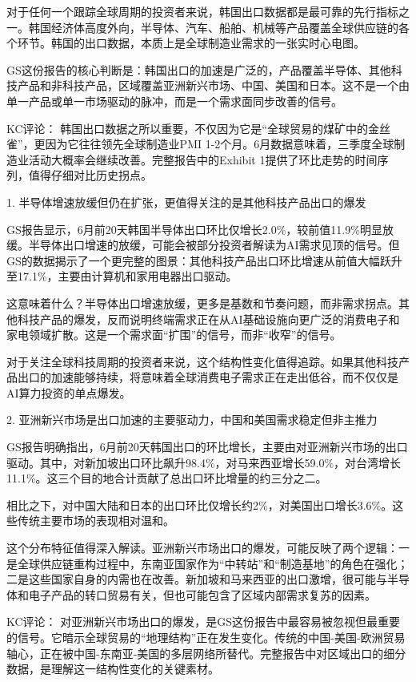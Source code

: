 \documentclass[11pt]{ctexart}
\begin{document}
对于任何一个跟踪全球周期的投资者来说，韩国出口数据都是最可靠的先行指标之一。韩国经济体高度外向，半导体、汽车、船舶、机械等产品覆盖全球供应链的各个环节。韩国的出口数据，本质上是全球制造业需求的一张实时心电图。

GS这份报告的核心判断是：韩国出口的加速是广泛的，产品覆盖半导体、其他科技产品和非科技产品，区域覆盖亚洲新兴市场、中国、美国和日本。这不是一个由单一产品或单一市场驱动的脉冲，而是一个需求面同步改善的信号。

KC评论： 韩国出口数据之所以重要，不仅因为它是“全球贸易的煤矿中的金丝雀”，更因为它往往领先全球制造业PMI 1-2个月。6月数据意味着，三季度全球制造业活动大概率会继续改善。完整报告中的Exhibit 1提供了环比走势的时间序列，值得仔细对比历史拐点。

1. 半导体增速放缓但仍在扩张，更值得关注的是其他科技产品出口的爆发

GS报告显示，6月前20天韩国半导体出口环比仅增长2.0\%，较前值11.9\%明显放缓。半导体出口增速的放缓，可能会被部分投资者解读为AI需求见顶的信号。但GS的数据揭示了一个更完整的图景：其他科技产品出口环比增速从前值大幅跃升至17.1\%，主要由计算机和家用电器出口驱动。

这意味着什么？半导体出口增速放缓，更多是基数和节奏问题，而非需求拐点。其他科技产品的爆发，反而说明终端需求正在从AI基础设施向更广泛的消费电子和家电领域扩散。这是一个需求面“扩围”的信号，而非“收窄”的信号。

对于关注全球科技周期的投资者来说，这个结构性变化值得追踪。如果其他科技产品出口的加速能够持续，将意味着全球消费电子需求正在走出低谷，而不仅仅是AI算力投资的单点爆发。

2. 亚洲新兴市场是出口加速的主要驱动力，中国和美国需求稳定但非主推力

GS报告明确指出，6月前20天韩国出口的环比增长，主要由对亚洲新兴市场的出口驱动。其中，对新加坡出口环比飙升98.4\%，对马来西亚增长59.0\%，对台湾增长11.1\%。这三个目的地合计贡献了总出口环比增量的约三分之二。

相比之下，对中国大陆和日本的出口环比仅增长约2\%，对美国出口增长3.6\%。这些传统主要市场的表现相对温和。

这个分布特征值得深入解读。亚洲新兴市场出口的爆发，可能反映了两个逻辑：一是全球供应链重构过程中，东南亚国家作为“中转站”和“制造基地”的角色在强化；二是这些国家自身的内需也在改善。新加坡和马来西亚的出口激增，很可能与半导体和电子产品的转口贸易有关，但也可能包含了区域内部需求复苏的因素。

KC评论： 对亚洲新兴市场出口的爆发，是GS这份报告中最容易被忽视但最重要的信号。它暗示全球贸易的“地理结构”正在发生变化。传统的中国-美国-欧洲贸易轴心，正在被中国-东南亚-美国的多层网络所替代。完整报告中对区域出口的细分数据，是理解这一结构性变化的关键素材。
\end{document}
